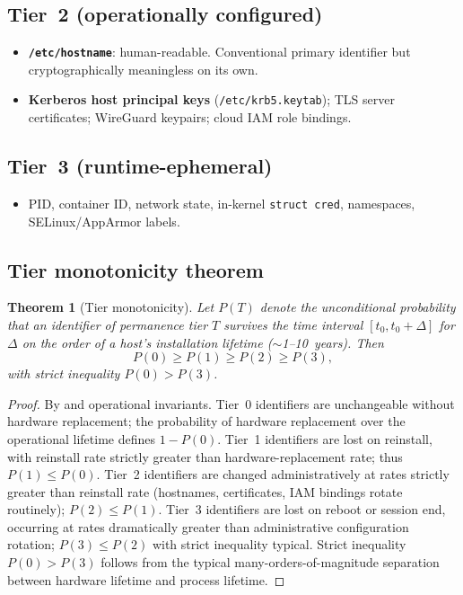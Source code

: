 \documentclass[11pt,a4paper,parskip=half-,DIV=12,headings=standardclasses]{scrartcl}
\theoremstyle{ncthm}
\newtheorem{theorem}{Theorem}[section]
\theoremstyle{ncdef}
\begin{document}
\subsection{Tier~2 (operationally configured)}

\begin{itemize}
\item \textbf{\texttt{/etc/hostname}}: human-readable. Conventional
  primary identifier but cryptographically meaningless on its own.
\item \textbf{Kerberos host principal keys}
  (\texttt{/etc/krb5.keytab}); TLS server certificates; WireGuard
  keypairs; cloud IAM role bindings.
\end{itemize}

\subsection{Tier~3 (runtime-ephemeral)}

\begin{itemize}
\item PID, container ID, network state, in-kernel
  \texttt{struct cred}, namespaces, SELinux/AppArmor labels.
\end{itemize}

\subsection{Tier monotonicity theorem}

\begin{theorem}[Tier monotonicity]\label{thm:tier-monotonicity}
Let $P(T)$ denote the unconditional probability that an identifier
of permanence tier $T$ survives the time interval $[t_0, t_0 + \Delta]$
for $\Delta$ on the order of a host's installation lifetime
($\sim$1--10~years). Then
\[
P(0) \geq P(1) \geq P(2) \geq P(3),
\]
with strict inequality $P(0) > P(3)$.
\end{theorem}

\begin{proof}
By  and operational invariants. Tier~0 identifiers
are unchangeable without hardware replacement; the probability of
hardware replacement over the operational lifetime defines $1 - P(0)$.
Tier~1 identifiers are lost on reinstall, with reinstall rate strictly
greater than hardware-replacement rate; thus $P(1) \leq P(0)$.
Tier~2 identifiers are changed administratively at rates strictly
greater than reinstall rate (hostnames, certificates, IAM bindings
rotate routinely); $P(2) \leq P(1)$. Tier~3 identifiers are lost on
reboot or session end, occurring at rates dramatically greater than
administrative configuration rotation; $P(3) \leq P(2)$ with strict
inequality typical. Strict inequality $P(0) > P(3)$ follows from the
typical many-orders-of-magnitude separation between hardware lifetime
and process lifetime.
\end{proof}
\end{document}

